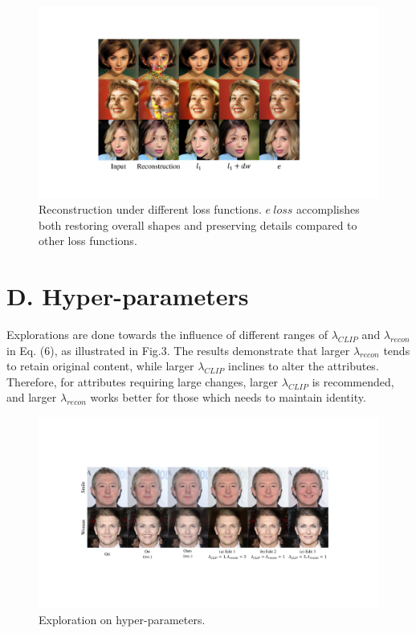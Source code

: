 \documentclass[letterpaper]{article} %
\begin{document}
\begin{figure}[t]
    \centering
    \includegraphics[width=1\columnwidth]{Figs/fig10.pdf}
    \caption{Reconstruction under different loss functions. $e ~loss$ accomplishes both restoring overall shapes and preserving details compared to other loss functions.}
    \label{fig10}
\end{figure}

\section{D. Hyper-parameters}

Explorations are done towards the influence of different ranges of $\lambda_{CLIP}$ and $\lambda_{recon}$ in Eq. (6), as illustrated in Fig.3. The results demonstrate that larger $\lambda_{recon}$ tends to retain original content, while larger $\lambda_{CLIP}$ inclines to alter the attributes. Therefore, for attributes requiring large changes, larger $\lambda_{CLIP}$ is recommended, and larger $\lambda_{recon}$ works better for those which needs to maintain identity.

\begin{figure}[t]
    \centering
    \includegraphics[width=1\columnwidth]{Figs/fig19.pdf}
    \caption{Exploration on hyper-parameters.}
    \label{fig11}
\end{figure}
\end{document}
